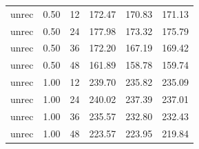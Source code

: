 \documentclass[11pt,a4paper,]{article}
\let\origtable\table
\let\endorigtable\endtable
\renewenvironment{table}[1][2] {
    \expandafter\origtable\expandafter[!htbp]
} {
    \endorigtable
}
\begin{document}
\begin{table}[!h]
\begin{tabular}[t]{lrrrrl}
unrec & 0.50 & 12 & 172.47 & 170.83 & 171.13\\
unrec & 0.50 & 24 & 177.98 & 173.32 & 175.79\\
unrec & 0.50 & 36 & 172.20 & 167.19 & 169.42\\
unrec & 0.50 & 48 & 161.89 & 158.78 & 159.74\\
unrec & 1.00 & 12 & 239.70 & 235.82 & 235.09\\
unrec & 1.00 & 24 & 240.02 & 237.39 & 237.01\\
unrec & 1.00 & 36 & 235.57 & 232.80 & 232.43\\
unrec & 1.00 & 48 & 223.57 & 223.95 & 219.84\\
\bottomrule
\end{tabular}
\end{table}

\begin{table}[!h]


\end{table}
\end{document}
